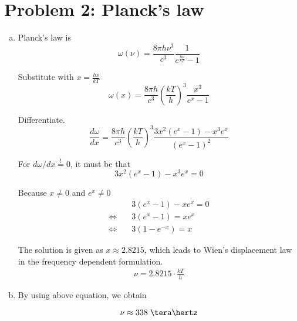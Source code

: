 \documentclass[a4paper,german,12pt,smallheadings]{scrartcl}
\begin{document}
\section*{Problem 2: Planck's law}
\begin{enumerate}[a)]
  \item
    Planck's law is
    \begin{equation*}
      \omega(\nu) = \frac{8 \pi h \nu^3}{c^3} \frac{1}{e^\frac{h \nu}{kT} - 1}
    \end{equation*}

    Substitute with $x = \frac{h \nu}{kT}$
    \begin{equation*}
      \omega(x) = \frac{8 \pi h}{c^3} \left(\frac{kT}{h}\right)^3 \frac{x^3}{e^x - 1}
    \end{equation*}

    Differentiate.
    \begin{equation*}
      \frac{d \omega}{dx} = \frac{8 \pi h}{c^3} \left(\frac{kT}{h}\right)^3 \frac{3x^2(e^x-1) - x^3e^x}{(e^x - 1)^2}
    \end{equation*}

    For $d \omega / dx \overset{!}{=} 0$, it must be that
    \begin{equation*}
      3x^2(e^x-1) - x^3e^x = 0
    \end{equation*}

    Because $x \neq 0$ and $e^x \neq 0$
    \begin{align*}
      &\quad 3(e^x-1) - xe^x = 0 \\
      \Leftrightarrow&\quad 3(e^x-1) = xe^x \\
      \Leftrightarrow&\quad 3(1 - e^{-x}) = x
    \end{align*}

    The solution is given as $x \approx 2.8215$, which leads to Wien's
    displacement law in the frequency dependent formulation.
    \begin{align*}
      \nu = 2.8215 \cdot \frac{kT}{h}
    \end{align*}

  \item
    By using above equation, we obtain

    \begin{equation*}
      \nu \approx 338 \; \tera\hertz
    \end{equation*}

\end{enumerate}
\end{document}
